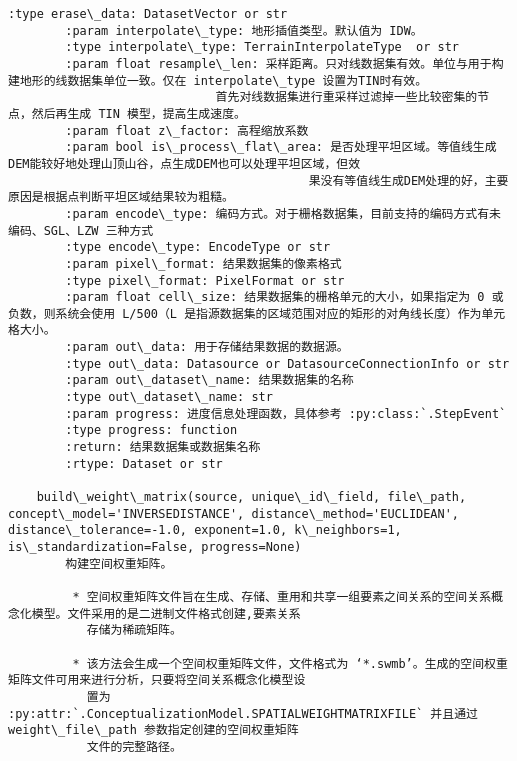 \documentclass[11pt]{article}
\begin{document}
\begin{Verbatim}[commandchars=\\\{\}]
        :type erase\_data: DatasetVector or str
        :param interpolate\_type: 地形插值类型。默认值为 IDW。
        :type interpolate\_type: TerrainInterpolateType  or str
        :param float resample\_len: 采样距离。只对线数据集有效。单位与用于构建地形的线数据集单位一致。仅在 interpolate\_type 设置为TIN时有效。
                             首先对线数据集进行重采样过滤掉一些比较密集的节点，然后再生成 TIN 模型，提高生成速度。
        :param float z\_factor: 高程缩放系数
        :param bool is\_process\_flat\_area: 是否处理平坦区域。等值线生成DEM能较好地处理山顶山谷，点生成DEM也可以处理平坦区域，但效
                                          果没有等值线生成DEM处理的好，主要原因是根据点判断平坦区域结果较为粗糙。
        :param encode\_type: 编码方式。对于栅格数据集，目前支持的编码方式有未编码、SGL、LZW 三种方式
        :type encode\_type: EncodeType or str
        :param pixel\_format: 结果数据集的像素格式
        :type pixel\_format: PixelFormat or str
        :param float cell\_size: 结果数据集的栅格单元的大小，如果指定为 0 或负数，则系统会使用 L/500（L 是指源数据集的区域范围对应的矩形的对角线长度）作为单元格大小。
        :param out\_data: 用于存储结果数据的数据源。
        :type out\_data: Datasource or DatasourceConnectionInfo or str
        :param out\_dataset\_name: 结果数据集的名称
        :type out\_dataset\_name: str
        :param progress: 进度信息处理函数，具体参考 :py:class:`.StepEvent`
        :type progress: function
        :return: 结果数据集或数据集名称
        :rtype: Dataset or str
    
    build\_weight\_matrix(source, unique\_id\_field, file\_path, concept\_model='INVERSEDISTANCE', distance\_method='EUCLIDEAN', distance\_tolerance=-1.0, exponent=1.0, k\_neighbors=1, is\_standardization=False, progress=None)
        构建空间权重矩阵。
        
         * 空间权重矩阵文件旨在生成、存储、重用和共享一组要素之间关系的空间关系概念化模型。文件采用的是二进制文件格式创建,要素关系
           存储为稀疏矩阵。
        
         * 该方法会生成一个空间权重矩阵文件，文件格式为 ‘*.swmb’。生成的空间权重矩阵文件可用来进行分析，只要将空间关系概念化模型设
           置为 :py:attr:`.ConceptualizationModel.SPATIALWEIGHTMATRIXFILE` 并且通过 weight\_file\_path 参数指定创建的空间权重矩阵
           文件的完整路径。
        

\end{Verbatim}
\end{document}
